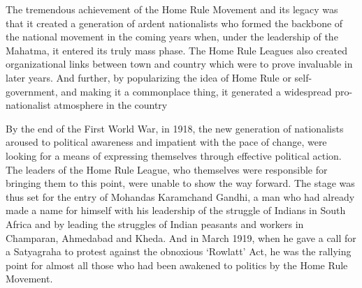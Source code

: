 The tremendous achievement of the Home Rule Movement and its legacy was that it created a generation of ardent nationalists who formed the backbone of the national movement in the coming years when, under the leadership of the Mahatma, it entered its truly mass phase. The Home Rule Leagues also created organizational links between town and country which were to prove invaluable in later years. And further, by popularizing the idea of Home Rule or self-government, and making it a commonplace thing, it generated a widespread pro- nationalist atmosphere in the country

By the end of the First World War, in 1918, the new generation of nationalists aroused to political awareness and impatient with the pace of change, were looking for a means of expressing themselves through effective political action. The leaders of the Home Rule League, who themselves were responsible for bringing them to this point, were unable to show the way forward. The stage was thus set for the entry of Mohandas Karamchand Gandhi, a man who had already made a name for himself with his leadership of the struggle of Indians in South Africa and by leading the struggles of Indian peasants and workers in Champaran, Ahmedabad and Kheda. And in March 1919, when he gave a call for a Satyagraha to protest against the obnoxious `Rowlatt' Act, he was the rallying point for almost all those who had been awakened to politics by the Home Rule Movement.
